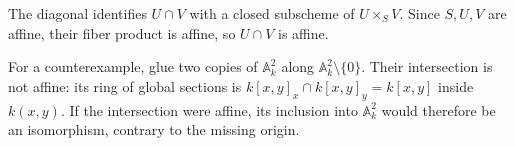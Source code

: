 The diagonal identifies $U\cap V$ with a closed subscheme of $U\times_SV$. Since $S,U,V$ are affine, their fiber product is affine, so $U\cap V$ is affine.

For a counterexample, glue two copies of $\mathbb A_k^2$ along $\mathbb A_k^2\setminus\{0\}$. Their intersection is not affine: its ring of global sections is $k[x,y]_x\cap k[x,y]_y=k[x,y]$ inside $k(x,y)$. If the intersection were affine, its inclusion into $\mathbb A_k^2$ would therefore be an isomorphism, contrary to the missing origin.
